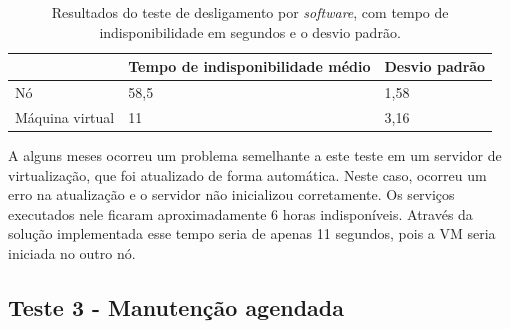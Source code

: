 
\begin{table}[h!]
\caption{Resultados do teste de desligamento por \textit{software}, com tempo de indisponibilidade em segundos e o desvio padrão.}
\small
\label{tab:teste2resultados}
\begin{center}
\begin{tabular}{|l|l|l|}\hline
 & \textbf{Tempo de indisponibilidade médio} & \textbf{Desvio padrão} \\\hline
Nó & 58,5 & 1,58 \\\hline
Máquina virtual & 11 & 3,16 \\\hline
\end{tabular}
\end{center}
\end{table}

A alguns meses ocorreu um problema semelhante a este teste em um servidor de virtualização, que foi atualizado de forma automática. Neste caso, 
ocorreu um erro na atualização e o servidor não inicializou corretamente. Os serviços executados nele ficaram aproximadamente 
6 horas indisponíveis. Através da solução implementada esse tempo seria de apenas 11 segundos, pois a \ac{VM} seria iniciada no outro nó. 

\subsection{Teste 3 - Manutenção agendada}

